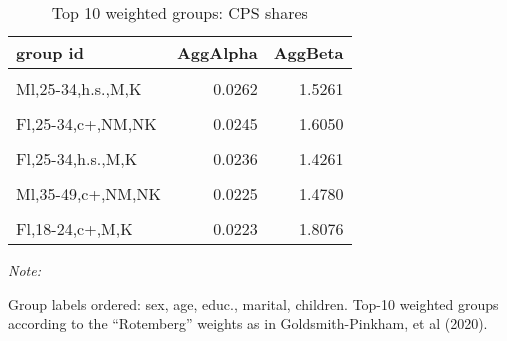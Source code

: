 \begin{table}

\caption{\label{tab:rotweights:cps}Top 10 weighted groups: CPS shares}
\centering
\begin{threeparttable}
\begin{tabular}[t]{lrr}
\toprule
group id & AggAlpha & AggBeta\\
\midrule
\cellcolor{gray!6}{Ml,25-34,c+,M,K} & \cellcolor{gray!6}{0.0302} & \cellcolor{gray!6}{1.5840}\\
\addlinespace
Ml,25-34,h.s.,M,K & 0.0262 & 1.5261\\
\addlinespace
\cellcolor{gray!6}{Fl,35-49,c+,M,K} & \cellcolor{gray!6}{0.0253} & \cellcolor{gray!6}{1.6094}\\
\addlinespace
Fl,25-34,c+,NM,NK & 0.0245 & 1.6050\\
\addlinespace
\cellcolor{gray!6}{Fl,25-34,s.h.s.,M,K} & \cellcolor{gray!6}{0.0241} & \cellcolor{gray!6}{1.7630}\\
\addlinespace
Fl,25-34,h.s.,M,K & 0.0236 & 1.4261\\
\addlinespace
\cellcolor{gray!6}{Ml,25-34,h.s.,M,NK} & \cellcolor{gray!6}{0.0230} & \cellcolor{gray!6}{1.5975}\\
\addlinespace
Ml,35-49,c+,NM,NK & 0.0225 & 1.4780\\
\addlinespace
\cellcolor{gray!6}{Ml,25-34,c+,NM,NK} & \cellcolor{gray!6}{0.0223} & \cellcolor{gray!6}{1.3878}\\
\addlinespace
Fl,18-24,c+,M,K & 0.0223 & 1.8076\\
\bottomrule
\end{tabular}
\begin{tablenotes}
\item \textit{Note: } 
\item Group labels ordered: sex, age, educ., marital, children. Top-10 weighted groups according to the ``Rotemberg'' weights as in Goldsmith-Pinkham, et al (2020).
\end{tablenotes}
\end{threeparttable}
\end{table}
